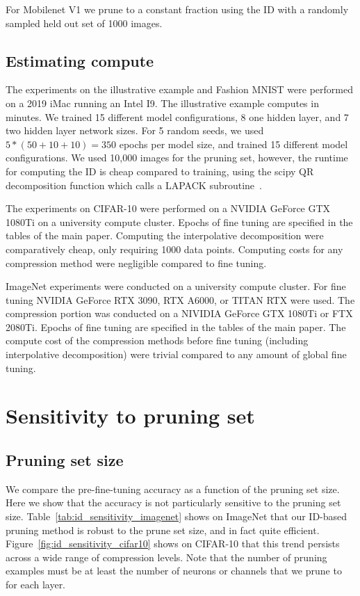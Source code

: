 For Mobilenet V1 we prune to a constant fraction using the ID with a randomly sampled held out set of 1000 images.


\subsection{Estimating compute}
The experiments on the illustrative example and Fashion MNIST were performed on a 2019 iMac running an Intel I9. The illustrative example computes in minutes. We trained 15 different model configurations, 8 one hidden layer, and 7 two hidden layer network sizes.  For 5 random seeds, we used $5*(50+10+10)=350$ epochs per model size, and trained 15 different model configurations.   We used 10,000 images for the pruning set, however, the runtime for computing the ID is cheap compared to training, using the scipy QR decomposition function which calls a LAPACK subroutine~\cite{lapack}.

The experiments on CIFAR-10 were performed on a NVIDIA GeForce GTX 1080Ti on a university compute cluster. 
Epochs of fine tuning are specified in the tables of the main paper.
Computing the interpolative decomposition were comparatively cheap, only requiring 1000 data points. 
Computing costs for any compression method were negligible compared to fine tuning.

ImageNet experiments were conducted on a university compute cluster.
For fine tuning NVIDIA GeForce RTX 3090, RTX A6000, or TITAN RTX were used.
The compression portion was conducted on a NIVIDIA GeForce GTX 1080Ti or FTX 2080Ti.
Epochs of fine tuning are specified in the tables of the main paper.
The compute cost of the compression methods before fine tuning (including interpolative decomposition) were trivial compared to any amount of global fine tuning.



\section{Sensitivity to pruning set}
\label{sec:sensitivity}
\subsection{Pruning set size}
We compare the pre-fine-tuning accuracy as a function of the pruning set size. 
Here we show that the accuracy is not particularly sensitive to the pruning set size.
Table~\ref{tab:id_sensitivity_imagenet} shows on ImageNet that our ID-based pruning method is robust to the prune set size, and in fact quite efficient.
Figure~\ref{fig:id_sensitivity_cifar10} shows on CIFAR-10 that this trend persists across a wide range of compression levels.
Note that the number of pruning examples must be at least the number of neurons or channels that we prune to for each layer.

